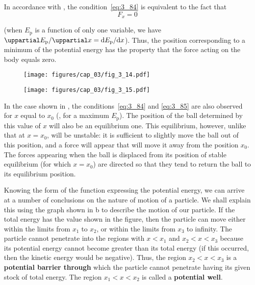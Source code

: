 \noindent
In accordance with , the condition~\eqref{eq:3_84} is equivalent to the fact that
\begin{equation}\label{eq:3_85}
F_x = 0
\end{equation}

\noindent
(when $E_{\text{p}}$ is a function of only one variable, we have $\diffinpartial{E_{\text{p}}}{x}=\diffin{E_{\text{p}}}{x}$). Thus, the position corresponding to a minimum of the potential energy has the property that the force acting on the body equals zero.

\begin{figure}[t]
	\begin{minipage}[t]{0.5\linewidth}
		\begin{center}
			\texttt{[image: figures/cap\_03/fig\_3\_14.pdf]}
			\caption[]{}
			\label{fig:3_14}
		\end{center}
	\end{minipage}
	\hspace{-0.05cm}
	\begin{minipage}[t]{0.5\linewidth}
		\begin{center}
			\texttt{[image: figures/cap\_03/fig\_3\_15.pdf]}
			\caption[]{}
			\label{fig:3_15}
		\end{center}
	\end{minipage}
	\vspace{-0.5cm}
\end{figure}

In the case shown in , the conditions~\eqref{eq:3_84} and \eqref{eq:3_85} are also observed for $x$ equal to $x_0$ (\ie, for a maximum $E_{\text{p}}$). The position of the ball determined by this value of $x$ will also be an equilibrium one. This equilibrium, however, unlike that at $x=x_0$, will be unstable: it is sufficient to slightly move the ball out of this position, and a force will appear that will move it away from the position $x_0$. The forces appearing when the ball is displaced from its position of stable equilibrium (for which $x=x_0$) are directed so that they tend to return the ball to its equilibrium position.

Knowing the form of the function expressing the potential energy, we can arrive at a number of conclusions on the nature of motion of a particle. We shall explain this using the graph shown in b to describe the motion of our particle. If the total energy has the value shown in the figure, then the particle can move either within the limits from $x_1$ to $x_2$, or within the limits from $x_3$ to infinity. The particle cannot penetrate into the regions with $x<x_1$ and $x_2<x<x_3$ because its potential energy cannot become greater than its total energy (if this occurred, then the kinetic energy would be negative). Thus, the region $x_2<x<x_3$ is a \textbf{potential barrier through} which the particle cannot penetrate having its given stock of total energy. The region $x_1<x<x_2$ is called a \textbf{potential well}.

